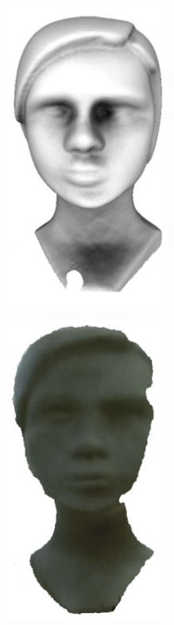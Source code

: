 \begin{figure}[H]
	\centering
	\begin{subfigure}[b]{0.32\textwidth}
		\centering
		\includegraphics[width=0.59\textwidth]{figures/calibration_models_ref.jpg}
		\caption{}
		\label{fig:calib:model:ref}
	\end{subfigure}
	\hskip 3pt 
	\begin{subfigure}[b]{0.32\textwidth}
		\centering
		\includegraphics[width=0.57\textwidth]{figures/calibration_models_calib.jpg}

\end{subfigure}
\end{figure}

